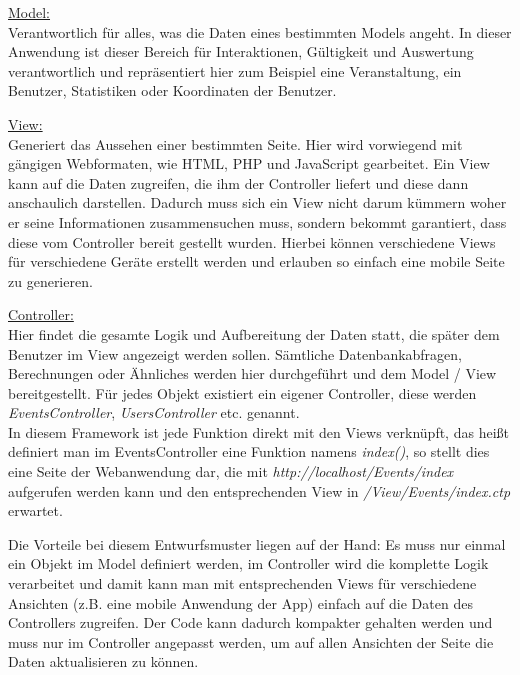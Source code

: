 \underline{Model:}\\
Verantwortlich für alles, was die Daten eines bestimmten Models angeht. In dieser Anwendung ist dieser Bereich für Interaktionen, Gültigkeit und Auswertung verantwortlich und repräsentiert hier zum Beispiel eine Veranstaltung, ein Benutzer, Statistiken oder Koordinaten der Benutzer.

\underline{View:}\\
Generiert das Aussehen einer bestimmten Seite. Hier wird vorwiegend mit gängigen Webformaten, wie HTML, PHP und JavaScript gearbeitet. Ein View kann auf die Daten zugreifen, die ihm der Controller liefert und diese dann anschaulich darstellen. Dadurch muss sich ein View nicht darum kümmern woher er seine Informationen zusammensuchen muss, sondern bekommt garantiert, dass diese vom Controller bereit gestellt wurden. Hierbei können verschiedene Views für verschiedene Geräte erstellt werden und erlauben so einfach eine mobile Seite zu generieren.

\underline{Controller:}\\
Hier findet die gesamte Logik und Aufbereitung der Daten statt, die später dem Benutzer im View angezeigt werden sollen. Sämtliche Datenbankabfragen, Berechnungen oder Ähnliches werden hier durchgeführt und dem Model / View bereitgestellt. Für jedes Objekt existiert ein eigener Controller, diese werden \emph{EventsController}, \emph{UsersController} etc. genannt. \\
In diesem Framework ist jede Funktion direkt mit den Views verknüpft, das heißt definiert man im EventsController eine Funktion namens \emph{index()}, so stellt dies eine Seite der Webanwendung dar, die mit \emph{http://localhost/Events/index} aufgerufen werden kann und den entsprechenden View in \emph{/View/Events/index.ctp} erwartet.\par

Die Vorteile bei diesem Entwurfsmuster liegen auf der Hand: Es muss nur einmal ein Objekt im Model definiert werden, im Controller wird die komplette Logik verarbeitet und damit kann man mit entsprechenden Views für verschiedene Ansichten (z.B. eine mobile Anwendung der App) einfach auf die Daten des Controllers zugreifen. Der Code kann dadurch kompakter gehalten werden und muss nur im Controller angepasst werden, um auf allen Ansichten der Seite die Daten aktualisieren zu können.


